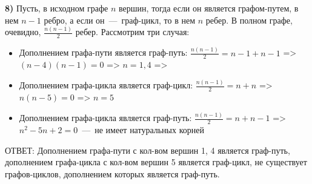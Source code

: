 \documentclass[12pt,a4paper,fleqn]{article}
\begin{document}
{\bf 8)} Пусть, в исходном графе $n$ вершин, тогда если он является графом-путем, в нем $n-1$ ребро, а если он~---~граф-цикл, то в нем $n$ ребер. В полном графе, очевидно, $\frac{n(n-1)}{2}$ ребер. Рассмотрим три случая:
\begin{itemize}
\item Дополнением графа-пути является граф-путь: $\frac{n(n-1)}{2} = n - 1 + n - 1$ => \newline
$(n-4)(n-1) = 0$ => $n = 1, 4$ => \newline
\item Дополнением графа-цикла является граф-цикл: $\frac{n(n-1)}{2} = n + n$ => \newline
$n(n-5) = 0$ => $n = 5$
\item Дополнением графа-цикла является граф-путь: $\frac{n(n-1)}{2} = n + n - 1$ => \newline
$n^2 -5n + 2 = 0$~---~не имеет натуральных корней 
\end{itemize} 
ОТВЕТ: Дополнением графа-пути с кол-вом вершин 1, 4 является граф-путь, дополнением графа-цикла с кол-вом вершин 5 является граф-цикл, не существует графов-циклов, дополнением которых является граф-путь.
\end{document}
